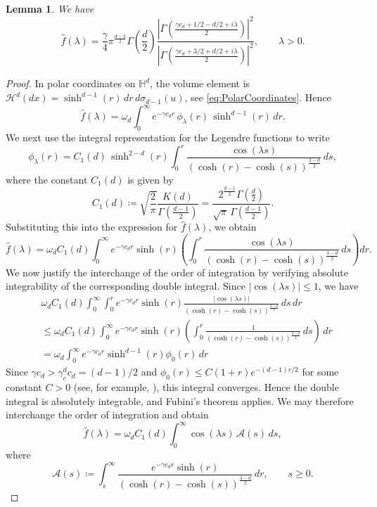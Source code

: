 \documentclass[11pt,a4paper]{article}
\theoremstyle{plain}
\newtheorem{lemma}[theorem]{Lemma}
\theoremstyle{definition}
\theoremstyle{remark}
\def\HH{\mathbb{H}}
\def\cA{\mathcal{A}}
\def\cH{\mathcal{H}}
\begin{document}
\begin{lemma}\label{lem:SphTrafo}
We have
\[
\widehat{f}(\lambda)
 = \frac{\gamma}{4} \pi^{\frac{d-2}{2}} \Gamma\left(\frac{d}{2}\right)
\frac{\left| \Gamma\left(\frac{\gamma c_d + 1/2 - d/2 + i\lambda}{2}\right) \right|^2}{
	\left| \Gamma\left(\frac{\gamma c_d + 3/2 + d/2 + i\lambda}{2}\right) \right|^2},\qquad \lambda>0.
\]
\end{lemma}
\begin{proof}
In polar coordinates on $\HH^d$, the volume element is $\cH^d(dx)=\sinh^{d-1}(r)\,dr\,d\sigma_{d-1}(u)$, see \eqref{eq:PolarCoordinates}. Hence
$$\widehat{f}(\lambda)=\omega_d\int_0^\infty e^{-\gamma c_d r}\,\phi_\lambda(r)\,\sinh^{d-1}(r)\,dr.$$
We next use the integral representation \cite[Formula 8.715.1]{Zwillinger} for the Legendre functions to write
$$\phi_\lambda(r) = C_1(d)\,\sinh^{2-d}(r) \int_0^r \frac{\cos(\lambda s)}{(\cosh (r)-\cosh (s))^{\frac{3-d}{2}}}\,ds,$$
where the constant $C_1(d)$ is given by
$$
C_1(d)
\coloneqq
\sqrt{\frac{2}{\pi}}\frac{K(d)}{\Gamma\!\left(\frac{d-1}{2}\right)}
=
\frac{2^{\frac{d-1}{2}}\Gamma\!\left(\frac d2\right)}{\sqrt{\pi}\,\Gamma\!\left(\frac{d-1}{2}\right)}.
$$
Substituting this into the expression for $\widehat{f}(\lambda)$, we obtain
$$\widehat{f}(\lambda) = \omega_d C_1(d)\int_0^\infty e^{-\gamma c_d r}\sinh(r) \left( \int_0^r \frac{\cos(\lambda s)}{(\cosh (r)-\cosh (s))^{\frac{3-d}{2}}}\,ds \right)dr.$$
We now justify the interchange of the order of integration by verifying absolute integrability of the corresponding double integral.
Since $|\cos(\lambda s)|\le 1$, we have
\begin{align*}
&\omega_d C_1(d)\int_0^\infty \int_0^r
e^{-\gamma c_d r}\sinh(r)
\frac{|\cos(\lambda s)|}{(\cosh(r)-\cosh(s))^{\frac{3-d}{2}}}
\,ds\,dr \\
&\le
\omega_d C_1(d)\int_0^\infty e^{-\gamma c_d r}\sinh(r)
\left(
\int_0^r \frac{1}{(\cosh(r)-\cosh(s))^{\frac{3-d}{2}}}\,ds
\right)\,dr\\
&=
\omega_d \int_0^\infty e^{-\gamma c_d r}\sinh^{d-1}(r)
\phi_0(r)\,dr
\end{align*}
Since $\gamma c_d > \gamma_c^{d} c_d = (d-1)/2$ and $\phi_0(r) \leq C (1+r)e^{-(d-1)r/2}$ for some constant $C> 0$ (see, for example, \cite[Lemma 2.4 and Remark 2.5]{ChenEtAl}), this integral converges. Hence the double integral is absolutely integrable, and Fubini's theorem applies. We may therefore interchange the order of integration and obtain
\[
\widehat{f}(\lambda)
=
\omega_d C_1(d)\int_0^\infty \cos(\lambda s)\,\cA(s)\,ds,
\]
where
\[
\cA(s)\coloneqq
\int_s^\infty
\frac{e^{-\gamma c_d r}\sinh(r)}{(\cosh(r)-\cosh(s))^{\frac{3-d}{2}}}\,dr,
\qquad s\ge 0.
\]


\end{proof}
\end{document}
